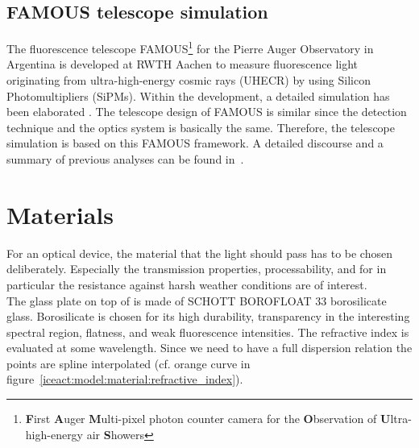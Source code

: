 \subsection{FAMOUS telescope simulation}\label{sec:famous_simulation}
The fluorescence telescope FAMOUS\footnote{\textbf{F}irst \textbf{A}uger \textbf{M}ulti-pixel
photon counter camera for the \textbf{O}bservation of \textbf{U}ltra-high-energy air \textbf{S}howers} for the Pierre Auger Observatory in Argentina is developed at RWTH Aachen to measure fluorescence light originating from ultra-high-energy cosmic rays (UHECR) by using Silicon Photomultipliers (SiPMs). Within the development, a detailed \geant simulation has been elaborated \cite{famous:sim_github,famous:sim_github}. The telescope design of FAMOUS is similar since the detection technique and the optics system is basically the same. Therefore, the \iceact telescope simulation is based on this FAMOUS \geant framework. A detailed discourse and a summary of previous analyses can be found in~\cite{famous:niggemann}.

\section{Materials}\label{sec:iceact:model:material}

For an optical device, the material that the light should pass has to be chosen deliberately. Especially the transmission properties, processability, and for \iceact in particular the resistance against harsh weather conditions are of interest.\\

The glass plate on top of \iceact is made of SCHOTT BOROFLOAT\textsuperscript{\textregistered} 33 borosilicate glass. Borosilicate is chosen for its high durability, transparency in the interesting spectral region, flatness, and weak fluorescence intensities. The refractive index is evaluated at some wavelength. Since we need to have a full dispersion relation the points are spline interpolated (cf. orange curve in figure~\ref{iceact:model:material:refractive_index}).~\cite{iceact:borosilicate:datasheet}


